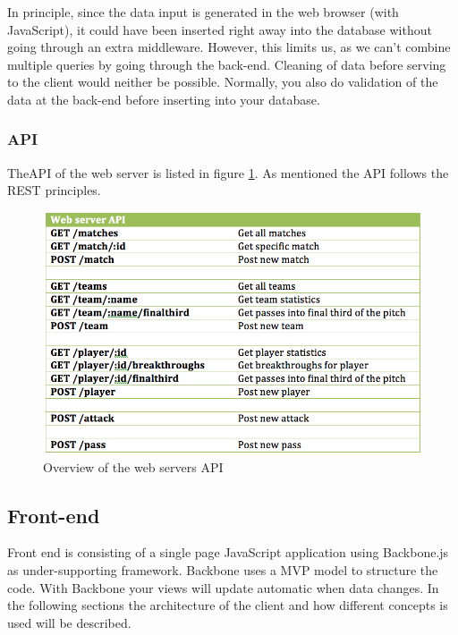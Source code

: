 In principle, since the data input is generated in the web browser (with JavaScript), it could have been inserted right away into the database without going through an extra middleware. However, this limits us, as we can’t combine multiple queries by going through the back-end. Cleaning of data before serving to the client would neither be possible. Normally, you also do validation of the data at the back-end before inserting into your database.

\subsubsection{API}

The\ac{API} of the web server is listed in figure \ref{fig:api}. As mentioned the \ac{API} follows the \ac{REST} principles. 

\begin{figure}[ht!]
\centering
\includegraphics[width=1\textwidth]{images/implementation/API.png}
\caption{Overview of the web servers API}
\label{fig:api}
\end{figure}

\subsection{Front-end}

Front end is consisting of a single page JavaScript application using Backbone.js \footnotemark as under-supporting framework. Backbone uses a \ac{MVP} model to structure the code. With Backbone your views will update automatic when data changes. In the following sections the architecture of the client and how different concepts is used will be described. 


